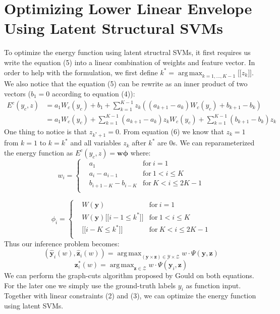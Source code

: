 \documentclass{article}
\DeclareMathOperator*{\argmax}{arg\,max}
\begin{document}
		\section{Optimizing Lower Linear Envelope Using Latent Structural SVMs}
		To optimize the energy function using latent structral SVMs, it first requires us write the equation (5) into a linear combination of weights and feature vector. In order to help with the formulation, we first define $k^* = \argmax_{k=1,\dots,K-1} \big[\big[z_{k}\big]\big]$. We also notice that the equation (5) can be rewrite as an inner product of two vectors ($b_1=0$ according to equation  (4)):
		\begin{align*}
		E^c(y_c,z)&=a_1W_c(y_c)+b_1+\sum_{k=1}^{K-1}z_k((a_{k+1}-a_k)W_c(y_c)+b_{k+1}-b_k)\\
		&=a_1W_c(y_c)+\sum_{k=1}^{K-1}(a_{k+1}-a_k)z_kW_c(y_c)+\sum_{k=1}^{K-1}(b_{k+1}-b_k)z_k
		\end{align*}
		One thing to notice is that $z_{k^*+1}=0$. From equation (6) we know that $z_k = 1$ from $k=1$ to $k=k^*$ and all variables $z_k$ after $k^*$ are $0$s. We can reparameterized the energy function as $E^c(y_c,z)=\mathbf{w}\mathbf{\phi}$ where:
		\begin{equation}
			w_i = \left\{
			\begin{aligned}
				& a_1	& \text{for} \ i=1\\
				& a_i-a_{i-1} & \text{for}\ 1< i \leq K\\
				& b_{i+1-K}-b_{i-K} & \text{for} \ K<i\le2K-1\\
			\end{aligned}
			\right.
		\end{equation}
		
		\begin{equation}
		\phi_i = \left\{
		\begin{aligned}
		& W(\mathbf{y}) 	& \text{for} \ i=1\\
		& W(\mathbf{y})\bigg[\bigg[i-1\le k^*\bigg]\bigg] & \text{for}\ 1<i\le K\\
		& \bigg[\bigg[ i-K\le k^*\bigg]\bigg]  & \text{for} \ K<i\le2K-1\\
		\end{aligned}
		\right.
		\end{equation}
		Thus our inference problem becomes:
		$$
		(\mathbf{\hat{y}}_i(w),\mathbf{\hat{z}}_i(w))=\argmax_{(\mathbf{y} \times \mathbf{z}) \in \mathcal{Y} \times \mathcal{Z}} w\cdot\Psi(\mathbf{y},\mathbf{z})
		$$
		$$
		\mathbf{z}^*_i(w) = \argmax_{\mathbf{z} \in \mathcal{Z}} w \cdot \Psi(\mathbf{y}_i,\mathbf{z})
		$$
		We can perform the graph-cuts algorithm proposed by Gould\cite{gouldlearning} on both equations. For the later one we simply use the ground-truth labels $y_i$ as function input. Together with linear constraints (2) and (3), we can optimize the energy function using latent SVMs.

	\renewcommand\refname{Bibliography}
	
	
\end{document}
